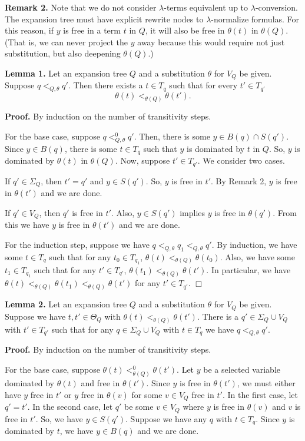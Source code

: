 {\bf Remark 2.}  Note that we do not consider $\lambda$-terms equivalent up to $\lambda$-conversion.
The expansion tree must have explicit rewrite nodes to $\lambda$-normalize formulas.
For this reason, if $y$ is free in a term $t$ in $Q$, it will also be free in $\theta(t)$ in $\theta(Q)$.
(That is, we can never project the $y$ away because this would require not just substitution,
but also deepening $\theta(Q)$.)

{\bf Lemma 1.}  Let an expansion tree $Q$ and a substitution $\theta$ for $V_Q$ be given.
Suppose $q <_{Q,\theta} q'$.
Then there exists a $t\in T_q$ such that for every $t'\in T_{q'}$
$$\theta(t) <_{\theta(Q)} \theta(t').$$

{\bf Proof.}  By induction on the number of transitivity steps.

For the base case, suppose $q <^0_{Q,\theta} q'$.  Then, there is some
$y\in B(q) \cap S(q')$.  Since $y\in B(q)$, there is some $t\in T_q$
such that $y$ is dominated by $t$ in $Q$.  So, $y$ is dominated by $\theta(t)$
in $\theta(Q)$.  Now, suppose $t'\in T_{q'}$.  We consider two cases.

If $q'\in \Sigma_Q$, then $t' = q'$ and $y\in S(q')$.  So, $y$ is free in $t'$.
By Remark 2, $y$ is free in $\theta(t')$ and we are done.

If $q' \in V_Q$, then $q'$ is free in $t'$.
Also, $y\in S(q')$ implies $y$ is free in $\theta(q')$.
From this we have $y$ is free in $\theta(t')$ and we are done.

For the induction step, suppose we have $q <_{Q,\theta} q_1 <_{Q,\theta} q'$.
By induction, we have some $t \in T_q$ such that for any $t_0 \in T_{q_1}$, $\theta(t) <_{\theta(Q)} \theta(t_0)$.
Also, we have some $t_1 \in T_{q_1}$ such that for any $t' \in T_{q'}$, $\theta(t_1) <_{\theta(Q)} \theta(t')$.
In particular, we have $\theta(t) <_{\theta(Q)} \theta(t_1) <_{\theta(Q)} \theta(t')$
for any $t'\in T_{q'}$. $\Box$

{\bf Lemma 2.}  Let an expansion tree $Q$ and a substitution $\theta$ for $V_Q$ be given.
Suppose we have $t, t'\in \Theta_Q$ with $\theta(t) <_{\theta(Q)} \theta(t')$.
There is a $q'\in \Sigma_Q \cup V_Q$ with $t' \in T_{q'}$ such that for any 
$q\in \Sigma_Q \cup V_Q$ with $t \in T_{q}$ 
we have $q <_{Q,\theta} q'$.

{\bf Proof.}  By induction on the number of transitivity steps.

For the base case, suppose $\theta(t) <^0_{\theta(Q)} \theta(t')$.
Let $y$ be a selected variable dominated by $\theta(t)$ and free in $\theta(t')$.
Since $y$ is free in $\theta(t')$, we must either have $y$ free in $t'$
or $y$ free in $\theta(v)$ for some $v\in V_Q$ free in $t'$.
In the first case, let $q' = t'$.  In the second case, let $q'$ be some $v \in V_Q$
where $y$ is free in $\theta(v)$ and $v$ is free in $t'$.
So, we have $y\in S(q')$.  Suppose we have any $q$ with $t\in T_q$.
Since $y$ is dominated by $t$, we have $y\in B(q)$ and we are done.

